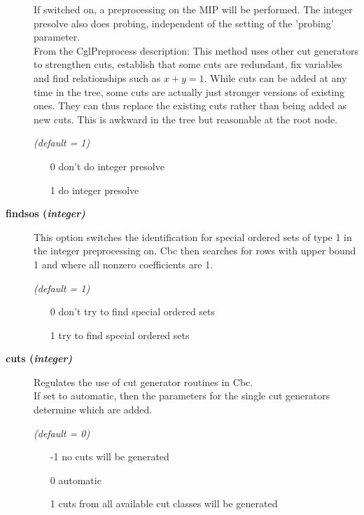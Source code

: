 \begin{description}
If switched on, a preprocessing on the MIP will be performed.
The integer presolve also does probing, independent of the setting of the 'probing' parameter.\\
From the CglPreprocess description:
This method uses other cut generators to strengthen cuts, establish that some cuts are redundant, fix variables and find relationships such as $x + y = 1$.
While cuts can be added at any time in the tree, some cuts are actually just stronger versions of existing ones.
They can thus replace the existing cuts rather than being added as new cuts. This is awkward in the tree but reasonable at the root node.

\textsl{(default = 1)}
\begin{itemize}
\item[0] don't do integer presolve
\item[1] do integer presolve
\end{itemize}

\item[\label{findsos}\hypertarget{findsos}
{\textbf{findsos (\slshape{integer})}}]\hspace{1.0in}

This option switches the identification for special ordered sets of type 1 in the integer preprocessing on.
Cbc then searches for rows with upper bound 1 and where all nonzero coefficients are 1.

\textsl{(default = 1)}
\begin{itemize}
\item[0] don't try to find special ordered sets
\item[1] try to find special ordered sets
\end{itemize}

\item[\label{cuts}\hypertarget{cuts}
{\textbf{cuts (\slshape{integer})}}]\hspace{1.0in}

Regulates the use of cut generator routines in Cbc.\\
If set to automatic, then the parameters for the single cut generators determine which are added.

\textsl{(default = 0)}
\begin{itemize}
\item[-1] no cuts will be generated
\item[0] automatic
\item[1] cuts from all available cut classes will be generated
\end{itemize}


\end{description}
